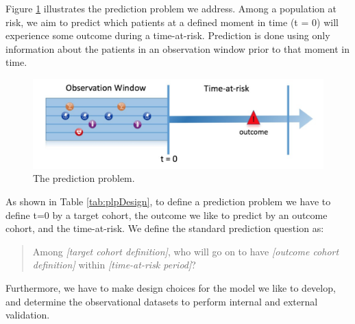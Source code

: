 \documentclass[11pt]{book}
\theoremstyle{definition}
\theoremstyle{definition}
\theoremstyle{definition}
\theoremstyle{remark}
\begin{document}
Figure \ref{fig:figure1} illustrates the prediction problem we address. Among a population at risk, we aim to predict which patients at a defined moment in time (t = 0) will experience some outcome during a time-at-risk. Prediction is done using only information about the patients in an observation window prior to that moment in time.

\begin{figure}
\includegraphics[width=1\linewidth]{images/PatientLevelPrediction/Figure1} \caption{The prediction problem.}\label{fig:figure1}
\end{figure}

As shown in Table \ref{tab:plpDesign}, to define a prediction problem we have to define t=0 by a target cohort, the outcome we like to predict by an outcome cohort, and the time-at-risk. We define the standard prediction question as:   

\begin{quote}
Among \emph{{[}target cohort definition{]}}, who will go on to have \emph{{[}outcome cohort definition{]}} within \emph{{[}time-at-risk period{]}}?
\end{quote}

Furthermore, we have to make design choices for the model we like to develop, and determine the observational datasets to perform internal and external validation.
\end{document}
